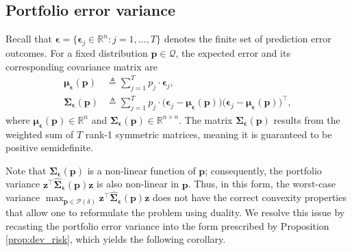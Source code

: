 \documentclass[10pt, twocolumn]{article}
\theoremstyle{plain}
\theoremstyle{definition}
\begin{document}
\begin{appendices}
\section{Portfolio error variance}\label{app:variance}

Recall that \(\bm{\epsilon} = \{\bm{\epsilon}_j\in\mathbb{R}^n: j = 1, 
\ldots, T\}\) denotes the finite set of prediction error outcomes. For 
a fixed distribution \(\bm{p}\in\mathcal{Q}\), the expected error and 
its corresponding covariance matrix are 
\begin{align}
	\bm{\mu}_{\bm{\epsilon}}(\bm{p}) 
		&\triangleq \sum_{j=1}^T p_j \cdot \bm{\epsilon}_j,\label{eq:mu}\\ 
	\bm{\Sigma}_{\bm{\epsilon}}(\bm{p}) 
		&\triangleq \sum_{j=1}^T p_j\cdot \big(\bm{\epsilon}_j - 
			\bm{\mu}_{\bm{\epsilon}}(\bm{p})\big)\big(\bm{\epsilon}_j 
			- \bm{\mu}_{\bm{\epsilon}}(\bm{p})\big)^\top,\label{eq:Sigma} 
\end{align}
where \(\bm{\mu}_{\bm{\epsilon}}(\bm{p})\in\mathbb{R}^n\) and
\(\bm{\Sigma}_{\bm{\epsilon}}(\bm{p})\in\mathbb{R}^{n\times n}\). The
matrix \(\bm{\Sigma}_{\bm{\epsilon}}(\bm{p})\) results from the weighted
sum of \(T\) rank-1 symmetric matrices, meaning it is guaranteed to be
positive semidefinite. 

Note that \(\bm{\Sigma}_{\bm{\epsilon}}(\bm{p})\) is a non-linear function
of \(\bm{p}\); consequently, the portfolio variance \(\bm{z}^\top
\hat{\bm{\Sigma}}_{\bm{\epsilon}}(\bm{p}) \bm{z}\) is also non-linear in
\(\bm{p}\).  Thus, in this form, the worst-case variance
\(\max_{\bm{p} \in \mathcal{P}(\delta)} \bm{z}^\top
\hat{\bm{\Sigma}}_{\bm{\epsilon}}(\bm{p}) \bm{z}\) does not have the
correct convexity properties that allow one to reformulate the problem
using duality. We resolve this issue by recasting the portfolio error
variance into the form prescribed by Proposition \ref{prop:dev_risk},
which yields the following corollary.  


\end{appendices}
\end{document}
